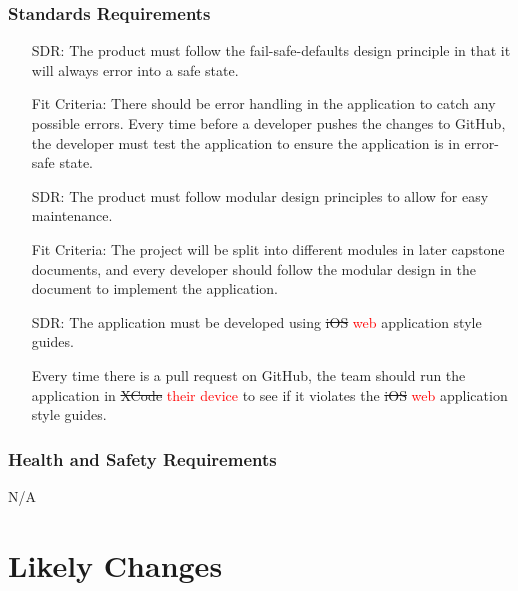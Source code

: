 \documentclass[12pt]{article}
\newcounter{reqnum} %
\newcounter{sdrreqnum} %
\begin{document}
\subsubsection{Standards Requirements}
\begin{itemize}
    \item[SDR\refstepcounter{sdrreqnum}\thesdrreqnum \label{R_Inputs}:] The product must follow the fail-safe-defaults design principle in that it will always error into a safe state.
    \item[] Fit Criteria: There should be error handling in the application to catch any possible errors. Every time before a developer pushes the changes to GitHub, the developer must test the application to ensure the application is in error-safe state.
    \item[SDR\refstepcounter{sdrreqnum}\thesdrreqnum \label{R_Inputs}:] The product must follow modular design principles to allow for easy maintenance.
    \item[] Fit Criteria: The project will be split into different modules in later capstone documents, and every developer should follow the modular design in the document to implement the application.
    \item[SDR\refstepcounter{sdrreqnum}\thesdrreqnum \label{R_Inputs}:] The application must be developed using \sout{iOS} \textcolor{red}{web} application style guides. 
    \item[] Every time there is a pull request on GitHub, the team should run the application in \sout{XCode} \textcolor{red}{their device} to see if it violates the \sout{iOS} \textcolor{red}{web} application style guides.

\end{itemize}

\subsubsection{Health and Safety Requirements}
N/A

\section{Likely Changes}    
\end{document}
